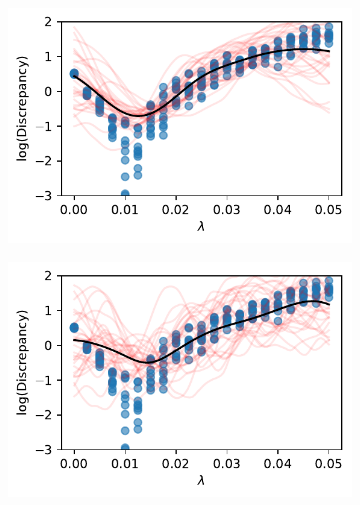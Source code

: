 \begin{figure}[htbp]
    \centering
    \begin{subfigure}[b]{0.5\textwidth}
        \centering
        \includegraphics[width=\textwidth]{
            ../champagne_GP_images/initial_lambda_slice_log_discrep.pdf
        }
    \end{subfigure}%
    \hfill%
    \begin{subfigure}[b]{0.5\textwidth}
        \centering
        \includegraphics[width=\textwidth]{
            ../champagne_GP_images/lambda_slice_100_bolfi_updates_log_discrep.pdf
        }
    \end{subfigure}
    \hfill%
    \begin{subfigure}[b]{0.5\textwidth}
        \centering

\end{subfigure}
\end{figure}
